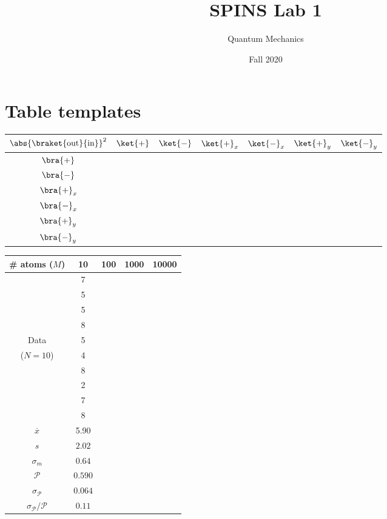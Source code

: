 \documentclass[12pt]{article}
\begin{document}
\title{SPINS Lab 1}
\author{Quantum Mechanics}
\date{Fall 2020}

\maketitle

\section*{Table templates}
\vspace{1in}
    
    \renewcommand{\arraystretch}{2}
	\begin{tabularx}{\textwidth}{|c|C{1}|C{1}|C{1}|C{1}|C{1}|C{1}|}
	    \hline
	    $\abs{\braket{\text{out}}{\text{in}}}^2$ & $\ket{+}$ & $\ket{-}$ & $\ket{+}_x$ & $\ket{-}_x$ & $\ket{+}_y$ & $\ket{-}_y$ \\ \hline
	    $\bra{+}$ &&&&&& \\ \hline
	    $\bra{-}$ &&&&&& \\ \hline
	    $\bra{+}_x$ &&&&&& \\ \hline
	    $\bra{-}_x$ &&&&&& \\ \hline
	    $\bra{+}_y$ &&&&&& \\ \hline
	    $\bra{-}_y$ &&&&&& \\ \hline
	\end{tabularx}
	
		\renewcommand{\arraystretch}{1.7}
		\begin{tabularx}{\textwidth}{|c|C{1}|C{1}|C{1}|C{1}|}
		    \hline
		    \# atoms ($M$)	& 10	& 100	& 1000	& 10000 \\ \hline
	        & 7 &&& \\ 
	        & 5 &&& \\ 
	        & 5 &&& \\ 
	        & 8 &&& \\ 
	        Data & 5 &&& \\ 
	        ($N=10$) & 4 &&& \\ 
	        & 8 &&& \\ 
	        & 2 &&& \\ 
	        & 7 &&& \\ 
	        & 8 &&& \\ \hline
	        $\overline{x}$ & 5.90 &&& \\ \hline
	        $s$ & $2.02$ &&& \\ \hline
	        $\sigma_m$ & $0.64$ &&& \\ \hline
	        $\mathcal{P}$ & $0.590$ &&& \\ \hline
	        $\sigma_\mathcal{P}$ & $0.064$ &&& \\ \hline
	        $\sigma_\mathcal{P}/\mathcal{P}$ & $0.11$ &&& \\ \hline
		\end{tabularx}
	
	\newpage
	
\end{document}
